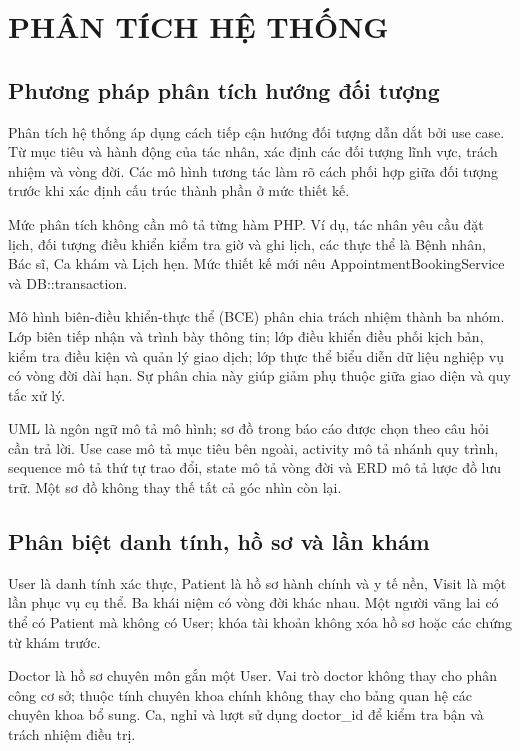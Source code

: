 \chapter{PHÂN TÍCH HỆ THỐNG}\label{ch:analysis}

\section{Phương pháp phân tích hướng đối tượng}
Phân tích hệ thống áp dụng cách tiếp cận hướng đối tượng dẫn dắt bởi use case.\allowbreak{} Từ mục tiêu và hành động của tác nhân, xác định các đối tượng lĩnh vực, trách nhiệm và vòng đời.\allowbreak{} Các mô hình tương tác làm rõ cách phối hợp giữa đối tượng trước khi xác định cấu trúc thành phần ở mức thiết kế.\allowbreak{}

Mức phân tích không cần mô tả từng hàm PHP.\allowbreak{} Ví dụ, tác nhân yêu cầu đặt lịch, đối tượng điều khiển kiểm tra giờ và ghi lịch, các thực thể là Bệnh nhân, Bác sĩ, Ca khám và Lịch hẹn.\allowbreak{} Mức thiết kế mới nêu Appointment\allowbreak{}Booking\allowbreak{}Service và DB:\allowbreak{}:\allowbreak{}transaction.\allowbreak{}

Mô hình biên-điều khiển-thực thể (BCE) phân chia trách nhiệm thành ba nhóm.\allowbreak{} Lớp biên tiếp nhận và trình bày thông tin; lớp điều khiển điều phối kịch bản, kiểm tra điều kiện và quản lý giao dịch; lớp thực thể biểu diễn dữ liệu nghiệp vụ có vòng đời dài hạn.\allowbreak{} Sự phân chia này giúp giảm phụ thuộc giữa giao diện và quy tắc xử lý.\allowbreak{}

UML là ngôn ngữ mô tả mô hình; sơ đồ trong báo cáo được chọn theo câu hỏi cần trả lời.\allowbreak{} Use case mô tả mục tiêu bên ngoài, activity mô tả nhánh quy trình, sequence mô tả thứ tự trao đổi, state mô tả vòng đời và ERD mô tả lược đồ lưu trữ.\allowbreak{} Một sơ đồ không thay thế tất cả góc nhìn còn lại.\allowbreak{}


\section{Phân biệt danh tính, hồ sơ và lần khám}
User là danh tính xác thực, Patient là hồ sơ hành chính và y tế nền, Visit là một lần phục vụ cụ thể.\allowbreak{} Ba khái niệm có vòng đời khác nhau.\allowbreak{} Một người vãng lai có thể có Patient mà không có User; khóa tài khoản không xóa hồ sơ hoặc các chứng từ khám trước.\allowbreak{}

Doctor là hồ sơ chuyên môn gắn một User.\allowbreak{} Vai trò doctor không thay cho phân công cơ sở; thuộc tính chuyên khoa chính không thay cho bảng quan hệ các chuyên khoa bổ sung.\allowbreak{} Ca, nghỉ và lượt sử dụng doctor\_\allowbreak{}id để kiểm tra bận và trách nhiệm điều trị.\allowbreak{}

